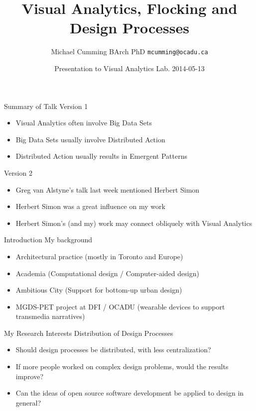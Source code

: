 \documentclass[handout]{beamer}
\title{Visual Analytics, Flocking and Design Processes}
\date[ISPN ’80]{Presentation to Visual Analytics Lab. 2014-05-13}
\author[MJC]{Michael Cumming BArch PhD \texttt{mcumming@ocadu.ca}}
\begin{document}
\begin{frame}
\titlepage
\end{frame}

\begin{frame}{Summary of Talk}
Version 1
\begin{itemize}
\item Visual Analytics often involve Big Data Sets
\item Big Data Sets usually involve Distributed Action
\item Distributed Action usually results in Emergent Patterns
\end{itemize}
\pause

\bigskip
Version 2
\begin{itemize}
\item Greg van Alstyne's talk last week mentioned Herbert Simon
\item Herbert Simon was a great influence on my work
\item Herbert Simon's (and my) work may connect obliquely with Visual Analytics
\end{itemize}

\end{frame}

\begin{frame}{Introduction}
My background
	\begin{itemize}
	\item Architectural practice (mostly in Toronto and Europe)
	\item Academia (Computational design / Computer-aided design)
	\item Ambitious City (Support for bottom-up urban design)
	\item MGDS-PET project at DFI / OCADU (wearable devices to support transmedia narratives)
	\end{itemize}
\end{frame}

\begin{frame}{My Research Interests}
Distribution of Design Processes
\begin{itemize}
\item Should design processes be distributed, with less centralization?
\pause
\item If more people worked on complex design problems, would the results improve?
\pause
\item Can the ideas of open source software development be applied to design in general?

\end{itemize}
\end{frame}
\end{document}
